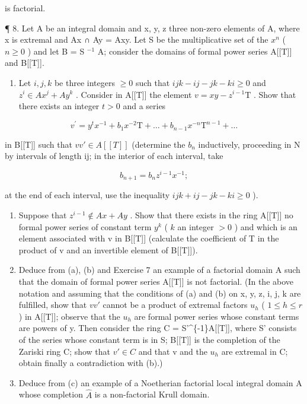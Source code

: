 is factorial.

¶ 8. Let A be an integral domain and x, y, z three non-zero elements of A, where x is extremal and Ax ∩ Ay = Axy. Let S be the multiplicative set of the \(x^{n}\) ( \(n \geqslant 0\) ) and let B = S \(^{-1}\) A; consider the domains of formal power series A{[}{[}T{]}{]} and B{[}{[}T{]}{]}.

\begin{enumerate}
\def\labelenumi{(\alph{enumi})}
\tightlist
\item
  Let \(i, j, k\) be three integers \(\geqslant 0\) such that \(ijk - ij - jk - ki \geqslant 0\) and \(z^i \in Ax^j + Ay^k\) . Consider in A{[}{[}T{]}{]} the element \(v = xy - z^{i-1}\mathrm{T}\) . Show that there exists an integer \(t > 0\) and a series
\end{enumerate}

\[
v ^ {\prime} = y ^ {t} x ^ {- 1} + b _ {1} x ^ {- 2} \mathrm{T} + \dots + b _ {n - 1} x ^ {- n} \mathrm{T} ^ {n - 1} + \dots
\]

in B{[}{[}T{]}{]} such that \(vv' \in A[[T]]\) (determine the \(b_{n}\) inductively, proceeding in N by intervals of length ij; in the interior of each interval, take

\[
b _ {n + 1} = b _ {n} z ^ {i - 1} x ^ {- 1};
\]

at the end of each interval, use the inequality \(ijk + ij - jk - ki \geqslant 0\) ).

\begin{enumerate}
\def\labelenumi{(\alph{enumi})}
\setcounter{enumi}{1}
\item
  Suppose that \(z^{i-1} \notin Ax + Ay\) . Show that there exists in the ring A{[}{[}T{]}{]} no formal power series of constant term \(y^k\) ( \(k\) an integer \(>0\) ) and which is an element associated with v in B{[}{[}T{]}{]} (calculate the coefficient of T in the product of v and an invertible element of B{[}{[}T{]}{]}).
\item
  Deduce from (a), (b) and Exercise 7 an example of a factorial domain A such that the domain of formal power series A{[}{[}T{]}{]} is not factorial. (In the above notation and assuming that the conditions of (a) and (b) on x, y, z, i, j, k are fulfilled, show that \(vv'\) cannot be a product of extremal factors \(u_{h}\) ( \(1 \leqslant h \leqslant r\) ) in A{[}{[}T{]}{]}; observe that the \(u_{h}\) are formal power series whose constant terms are powers of y. Then consider the ring C = S'\^{}\{-1\}A{[}{[}T{]}{]}, where S' consists of the series whose constant term is in S; B{[}{[}T{]}{]} is the completion of the Zariski ring C; show that \(v' \in C\) and that v and the \(u_{h}\) are extremal in C; obtain finally a contradiction with (b).)
\item
  Deduce from (c) an example of a Noetherian factorial local integral domain A whose completion \(\hat{A}\) is a non-factorial Krull domain.
\end{enumerate}

